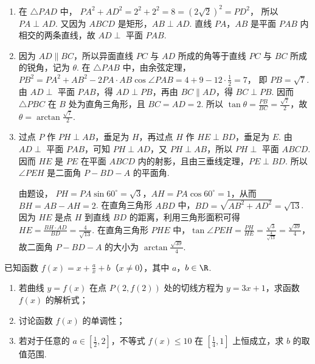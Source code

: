 \begin{solution}
\begin{enumerate}
\item
在 \(\triangle PAD\) 中，
\(PA^2+AD^2=2^2+2^2=8=(2\sqrt{2})^2=PD^2\)，
所以 \(PA\perp AD\). 又因为 \(ABCD\) 是矩形，\(AB\perp AD\). 直线 \(PA\)，\(AB\) 是平面 \(PAB\) 内相交的两条直线，故 \(AD\perp\) 平面 \(PAB\).

\item
因为 \(AD\parallel BC\)，所以异面直线 \(PC\) 与 \(AD\) 所成的角等于直线 \(PC\) 与 \(BC\) 所成的锐角，记为 \(\theta\). 在 \(\triangle PAB\) 中，由余弦定理，
\(PB^2=PA^2+AB^2-2PA\cdot AB\cos\angle PAB=4+9-12\cdot\frac12=7\)，
即 \(PB=\sqrt{7}\). 由 \(AD\perp\) 平面 \(PAB\)，得 \(AD\perp PB\)，再由 \(BC\parallel AD\)，得 \(BC\perp PB\). 因而 \(\triangle PBC\) 在 \(B\) 处为直角三角形，且 \(BC=AD=2\). 所以
\(\tan\theta=\frac{PB}{BC}=\frac{\sqrt{7}}{2}\)，故 \(\theta=\arctan\frac{\sqrt{7}}{2}\).

\item
过点 \(P\) 作 \(PH\perp AB\)，垂足为 \(H\)，再过点 \(H\) 作 \(HE\perp BD\)，垂足为 \(E\). 由 \(AD\perp\) 平面 \(PAB\)，可知 \(PH\perp AD\)，又 \(PH\perp AB\)，所以 \(PH\perp\) 平面 \(ABCD\). 因而 \(HE\) 是 \(PE\) 在平面 \(ABCD\) 内的射影，且由三垂线定理，\(PE\perp BD\). 所以 \(\angle PEH\) 是二面角 \(P-BD-A\) 的平面角.

由题设，
\(PH=PA\sin60^{\circ}=\sqrt{3}\)，\(AH=PA\cos60^{\circ}=1\)，从而 \(BH=AB-AH=2\). 在直角三角形 \(ABD\) 中，\(BD=\sqrt{AB^2+AD^2}=\sqrt{13}\). 因为 \(HE\) 是点 \(H\) 到直线 \(BD\) 的距离，利用三角形面积可得 \(HE=\frac{BH\cdot AD}{BD}=\frac4{\sqrt{13}}\). 在直角三角形 \(PHE\) 中，\(\tan\angle PEH=\frac{PH}{HE}=\frac{\sqrt{3}}{\frac{4}{\sqrt{13}}}=\frac{\sqrt{39}}4\)，
故二面角 \(P-BD-A\) 的大小为 \(\arctan\frac{\sqrt{39}}4\).
\end{enumerate}
\end{solution}

\begin{problem}
已知函数 \( f(x) = x + \frac{a}{x} + b \)（\(x \neq 0\)），其中 \(a\)，\(b \in \R\).
\begin{enumerate}
\item 若曲线 \( y = f(x) \) 在点 \( P(2, f(2)) \) 处的切线方程为 \( y = 3x + 1 \)，求函数 \( f(x) \) 的解析式；
\item 讨论函数 \( f(x) \) 的单调性；
\item 若对于任意的 \(a \in \left[\frac{1}{2}, 2\right]\)，不等式 \(f(x) \leqslant 10\) 在 \(\left[\frac{1}{4}, 1\right]\) 上恒成立，求 \(b\) 的取值范围.
\end{enumerate}
\end{problem}

